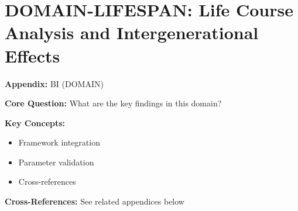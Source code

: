 \chapter{DOMAIN-LIFESPAN: Life Course Analysis and Intergenerational Effects}
\label{app:lifespan}


\begin{tcolorbox}[colback=blue!5!white, colframe=blue!75!black,
    title=Quick Reference: Appendix UNMAPPED_COR]

\textbf{Appendix:} BI (DOMAIN)

\textbf{Core Question:} What are the key findings in this domain?

\textbf{Key Concepts:}
\begin{itemize}[nosep]
\item Framework integration
\item Parameter validation
\item Cross-references
\end{itemize}

\textbf{Cross-References:} See related appendices below
\end{tcolorbox}


\begin{abstract}
This appendix extends the EBF life journey framework (Chapter 24) to the intergenerational
domain. While RRR, OOO, and PPP provide individual-level templates, dynamics, and simulations,
this appendix addresses how behavioral pathways propagate across generations: how parents'
Health, Money, Career, Relationships, Self-Governance, Living Space, and Meaning journeys
affect children's journey initialization states ($\phi_0$, segment distribution, parameter values).
The contribution is threefold: (1) a formal intergenerational spillover matrix $\Gamma^{inter}$,
(2) multi-generational case studies spanning 60+ years, and (3) policy implications for
family-level versus individual-level interventions.
\end{abstract}



